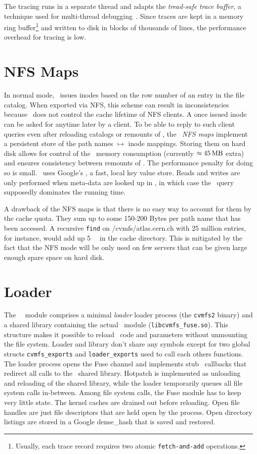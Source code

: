 The tracing runs in a separate thread and adapts the \emph{tread-safe trace buffer}, a technique used for multi-thread debugging~\cite[Chapter 8]{multicore06}.
Since traces are kept in a memory ring buffer\footnote{Usually, each trace record requires two atomic \texttt{fetch-and-add} operations.} and written to disk in blocks of thousands of lines, the performance overhead for tracing is low.

\section{NFS Maps}
In normal mode, \cvmfs\ issues inodes based on the row number of an entry in the file catalog.
When exported via NFS, this scheme can result in inconsistencies because \cvmfs\ does not control the cache lifetime of NFS clients.
A once issued inode can be asked for anytime later by a client. 
To be able to reply to such client queries even after reloading catalogs or remounts of \cvmfs, the \cvmfs\ \emph{NFS maps} implement a persistent store of the path names $\mapsto$ inode mappings.
Storing them on hard disk allows for control of the \cvmfs\ memory consumption (currently $\approx\SI{45}{\mega\byte}$ extra) and ensures consistency between remounts of \cvmfs. 
The performance penalty for doing so is small. 
\cvmfs\ uses Google's \leveldb\cite{leveldb}, a fast, local key value store. 
Reads and writes are only performed when meta-data are looked up in \sqlite, in which case the \sqlite\ query supposedly dominates the running time.

A drawback of the NFS maps is that there is no easy way to account for them by the cache quota. 
They sum up to some 150-200 Bytes per path name that has been accessed.
A recursive \texttt{find} on /cvmfs/atlas.cern.ch with 25 million entries, for instance, would add up \SI{5}{\giga\byte} in the cache directory.  
This is mitigated by the fact that the NFS mode will be only used on few servers that can be given large enough spare space on hard disk.

\section{Loader}

The \cvmfs\ \fuse\ module comprises a minimal \emph{loader} loader process (the \texttt{cvmfs2} binary) and a shared library containing the actual \fuse\ module (\texttt{libcvmfs\_fuse.so}).
This structure makes it possible to reload \cvmfs\ code and parameters without unmounting the file system.
Loader and library don't share any symbols except for two global structs \texttt{cvmfs\_exports} and \texttt{loader\_exports} used to call each others functions.  
The loader process opens the Fuse channel and implements stub \fuse\ callbacks that redirect all calls to the \cvmfs\ shared library.  
Hotpatch is implemented as unloading and reloading of the shared library, while the loader temporarily queues all file system calls in-between.  
Among file system calls, the Fuse module has to keep very little state.  
The kernel caches are drained out before reloading.  
Open file handles are just file descriptors that are held open by the process. 
Open directory listings are stored in a Google dense\_hash that is saved and restored. 

